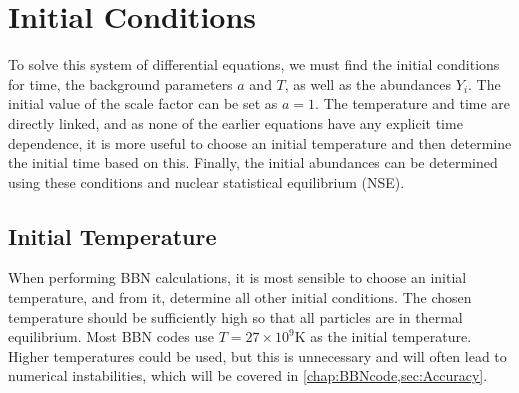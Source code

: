 
\section{Initial Conditions}
To solve this system of differential equations, we must find the initial conditions for time, the background parameters $a$ and $T$, as well as the abundances $Y_i$.
The initial value of the scale factor can be set as $a=1$. The temperature and time are directly linked, and as none of the earlier equations have any explicit time dependence, it is more useful to choose an initial temperature and then determine the initial time based on this. Finally, the initial abundances can be determined using these conditions and nuclear statistical equilibrium (NSE).

\subsection{Initial Temperature}
When performing BBN calculations, it is most sensible to choose an initial temperature, and from it, determine all other initial conditions. The chosen temperature should be sufficiently high so that all particles are in thermal equilibrium. Most BBN codes use $T=27\times10^9$K as the initial temperature. Higher temperatures could be used, but this is unnecessary and will often lead to numerical instabilities, which will be covered in \cref{chap:BBNcode,sec:Accuracy}.


